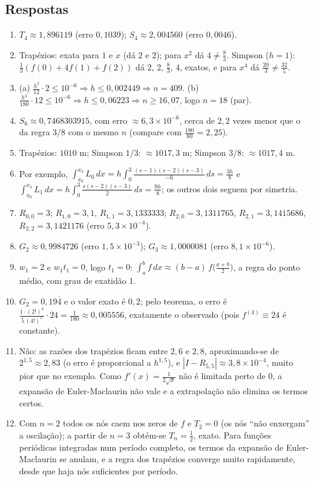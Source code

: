 \subsection*{Respostas}
\begin{enumerate}[label=\textbf{\arabic*.},leftmargin=*,nosep]
\item $T_4\approx1{,}896119$ (erro $0{,}1039$); $S_4\approx2{,}004560$ (erro $0{,}0046$).
\item Trapézios: exata para $1$ e $x$ (dá $2$ e $2$); para $x^2$ dá $4\ne\frac83$.
  Simpson ($h=1$): $\frac13(f(0)+4f(1)+f(2))$ dá $2$, $2$, $\frac83$, $4$, exatos, e para $x^4$
  dá $\frac{20}{3}\ne\frac{32}{5}$.
\item (a) $\frac{h^2}{12}\cdot2\le10^{-6}\Rightarrow h\le0{,}002449\Rightarrow n=409$.
  (b) $\frac{h^4}{180}\cdot12\le10^{-6}\Rightarrow h\le0{,}06223\Rightarrow n\ge16{,}07$, logo $n=18$ (par).
\item $S_6\approx0{,}7468303915$, com erro $\approx6{,}3\times10^{-6}$, cerca de $2{,}2$ vezes menor
  que o da regra $3/8$ com o mesmo $n$ (compare com $\frac{180}{80}=2{,}25$).
\item Trapézios: $1010$ m; Simpson $1/3$: $\approx1017{,}3$ m; Simpson $3/8$: $\approx1017{,}4$ m.
\item Por exemplo, $\int_{x_0}^{x_3}L_0\,dx=h\int_0^3\frac{(s-1)(s-2)(s-3)}{-6}\,ds=\frac{3h}{8}$
  e $\int_{x_0}^{x_3}L_1\,dx=h\int_0^3\frac{s(s-2)(s-3)}{2}\,ds=\frac{9h}{8}$; os outros dois
  seguem por simetria.
\item $R_{0,0}=3$; $R_{1,0}=3{,}1$, $R_{1,1}=3{,}1333333$; $R_{2,0}=3{,}1311765$,
  $R_{2,1}=3{,}1415686$, $R_{2,2}=3{,}1421176$ (erro $5{,}3\times10^{-4}$).
\item $G_2\approx0{,}9984726$ (erro $1{,}5\times10^{-3}$); $G_3\approx1{,}0000081$
  (erro $8{,}1\times10^{-6}$).
\item $w_1=2$ e $w_1t_1=0$, logo $t_1=0$: $\int_a^bf\,dx\approx(b-a)\,f\bigl(\frac{a+b}{2}\bigr)$,
  a regra do ponto médio, com grau de exatidão 1.
\item $G_2=0{,}19\overline{4}$ e o valor exato é $0{,}2$; pelo teorema, o erro é
  $\frac{1\cdot(2!)^4}{5\,(4!)^3}\cdot24=\frac{1}{180}\approx0{,}005556$, exatamente o observado
  (pois $f^{(4)}\equiv24$ é constante).
\item Não: as razões dos trapézios ficam entre $2{,}6$ e $2{,}8$, aproximando-se de $2^{1{,}5}\approx2{,}83$
  (o erro é proporcional a $h^{1{,}5}$), e
  $|I-R_{5,5}|\approx3{,}8\times10^{-4}$, muito pior que no exemplo. Como $f'(x)=\frac{1}{2\sqrt x}$
  não é limitada perto de 0, a expansão de Euler-Maclaurin não vale e a extrapolação não
  elimina os termos certos.
\item Com $n=2$ todos os nós caem nos zeros de $f$ e $T_2=0$ (os nós ``não enxergam'' a
  oscilação); a partir de $n=3$ obtém-se $T_n=\frac12$, exato. Para funções periódicas
  integradas num período completo, os termos da expansão de Euler-Maclaurin se anulam, e a
  regra dos trapézios converge muito rapidamente, desde que haja nós suficientes por período.
\end{enumerate}
